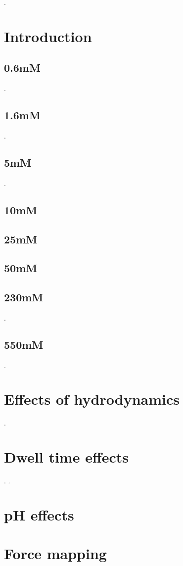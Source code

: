 \cite{John}.


\section{Introduction}

\newpage

\subsection{0.6mM}
\newpage.
\newpage

\subsection{1.6mM}

\newpage.
\newpage

\subsection{5mM}

\newpage.
\newpage

\subsection{10mM}

\newpage

\subsection{25mM}

\newpage

\subsection{50mM}

\newpage

\subsection{230mM}

\newpage.
\newpage

\subsection{550mM}

\newpage.
\newpage

\section{Effects of hydrodynamics}

\newpage.
\newpage

\section{Dwell time effects}

\newpage.
\newpage.
\newpage

\section{pH effects}

\newpage
\newpage

\section{Force mapping}
